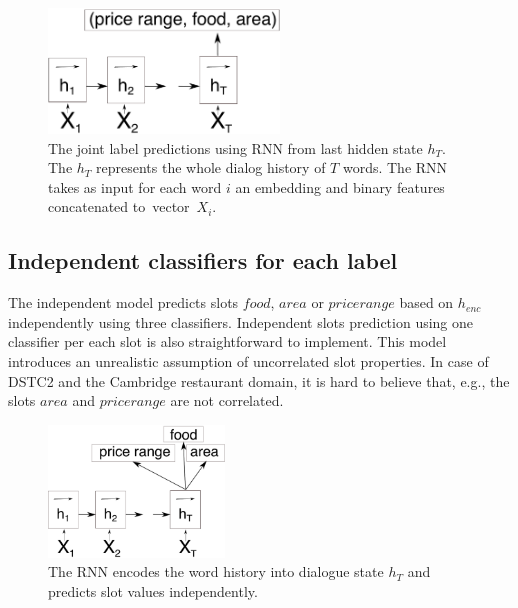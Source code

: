 \documentclass{itatnew}
\def\OD#1{{\color{darkgreen}OD: \it #1}}
\def\ODdel#1{\bgroup\markoverwith{\textcolor{darkgreen}{\rule[0.5ex]{2pt}{1pt}}}\ULon{#1}}
\begin{document}
\begin{figure}
\begin{center}
\includegraphics[height=9em]{encoder_joint}
\caption{The joint label predictions using RNN from last hidden state $h_T$. The $h_T$ represents the whole dialog history of $T$ words. The RNN takes as input for each word $i$ an embedding and binary features concatenated to~vector~$X_{i}$.}
\end{center}
\vspace{-0.70em}
\label{fig_encjoint}
\end{figure}

\subsection{Independent classifiers for each label}
\label{sec:indep}
The independent model predicts slots $food$, $area$ or $price range$ based on $h_{enc}$ independently using three classifiers.
Independent slots prediction using one classifier per each slot is also straightforward to implement.  %
This model introduces an unrealistic assumption of uncorrelated slot properties.
In case of DSTC2 and the Cambridge restaurant domain, it is hard to believe that, e.g., the slots $area$ and $price range$ are not correlated.

\begin{figure}
\begin{center}
\includegraphics[height=9.5em]{encoder}
\caption{The RNN encodes the word history into dialogue state $h_T$ and predicts slot values independently.}
\end{center}
\vspace{-0.80em}
\label{fig:encind}
\end{figure}
\end{document}

